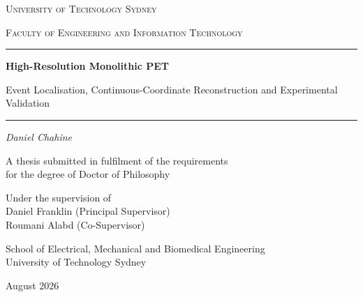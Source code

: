 \documentclass[11pt, a4paper, oneside]{report}
\newcommand{\thesistitle}{High-Resolution Monolithic PET}
\newcommand{\thesissubtitle}{Event Localisation, Continuous-Coordinate Reconstruction and Experimental Validation}
\newcommand{\thesisauthor}{Daniel Chahine}
\newcommand{\thesisdegree}{Doctor of Philosophy}
\newcommand{\thesisschool}{School of Electrical, Mechanical and Biomedical Engineering}
\newcommand{\thesisfaculty}{Faculty of Engineering and Information Technology}
\newcommand{\thesisuniversity}{University of Technology Sydney}
\newcommand{\thesisdate}{August 2026}
\begin{document}

\begin{titlepage}
	\centering

	{\scshape\Large \thesisuniversity\par}
	\vspace{0.8ex}
	{\scshape \thesisfaculty\par}


	\rule{\textwidth}{0.4pt}
	\vspace{2.2ex}

	{\huge\bfseries \thesistitle\par}
	\vspace{1.6ex}
	{\Large \thesissubtitle\par}

	\vspace{2.2ex}
	\rule{\textwidth}{0.4pt}


	{\Large\itshape \thesisauthor\par}


	A thesis submitted in fulfilment of the requirements\\
	for the degree of \thesisdegree


	Under the supervision of\\
	Daniel Franklin (Principal Supervisor)\\
	Roumani Alabd (Co-Supervisor)


	\thesisschool\\
	\thesisuniversity


	\thesisdate

\end{titlepage}
\setcounter{page}{2} %
\end{document}
